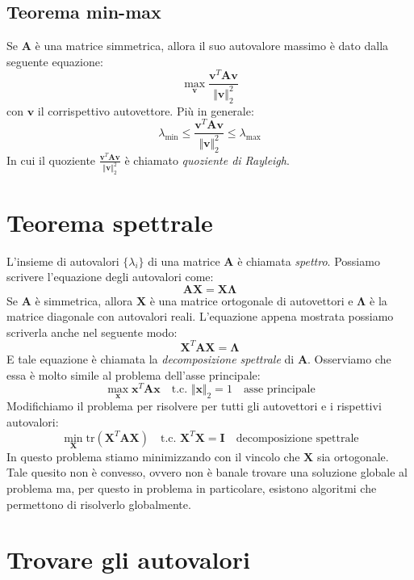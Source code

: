\documentclass{article}
\begin{document}
        \subsection{Teorema min-max}
            Se $\mathbf{A}$ è una matrice simmetrica, allora il suo autovalore massimo è dato dalla seguente equazione:
            \[\max_\mathbf{v} \frac{\mathbf{v}^T\mathbf{Av}}{\Vert \mathbf{v} \Vert_2^2}\]
            con $\mathbf{v}$ il corrispettivo autovettore. Più in generale:
            \[\lambda_{\text{min}} \leq \frac{\mathbf{v}^T\mathbf{Av}}{\Vert \mathbf{v} \Vert_2^2} \leq \lambda_{\text{max}}\]
            In cui il quoziente $\frac{\mathbf{v}^T\mathbf{Av}}{\Vert \mathbf{v} \Vert_2^2}$ è chiamato \emph{quoziente di Rayleigh}.

    \section{Teorema spettrale}
        L'insieme di autovalori $\{\lambda_i\}$ di una matrice $\mathbf{A}$ è chiamata \emph{spettro}. Possiamo scrivere 
        l'equazione degli autovalori come:
        \[\mathbf{AX} = \mathbf{X\Lambda} \]
        Se $\mathbf{A}$ è simmetrica, allora $\mathbf{X}$ è una matrice ortogonale di autovettori e $\mathbf{\Lambda}$ è la matrice
        diagonale con autovalori reali. L'equazione appena mostrata possiamo scriverla anche nel seguente modo:
        \[\mathbf{X}^T \mathbf{AX} = \mathbf{\Lambda} \]
        E tale equazione è chiamata la \emph{decomposizione spettrale} di $\mathbf{A}$. Osserviamo che essa è molto simile al problema 
        dell'asse principale:
        \[\max_{\mathbf{x}} \mathbf{x}^T\mathbf{Ax} \quad \text{t.c. }\Vert\mathbf{x}\Vert_2 = 1 \quad \text{asse principale}\]
        Modifichiamo il problema per risolvere per tutti gli autovettori e i rispettivi autovalori:
        \[\min_{\mathbf{X}} \text{tr}(\mathbf{X}^T\mathbf{AX}) \quad \text{t.c. }\mathbf{X}^T\mathbf{X}=\mathbf{I} \quad \text{decomposizione spettrale}\]
        In questo problema stiamo minimizzando con il vincolo che $\mathbf{X}$ sia ortogonale. Tale quesito non è convesso, 
        ovvero non è banale trovare 
        una soluzione globale al problema ma, per questo in problema in particolare, esistono algoritmi che permettono di risolverlo globalmente. 
\newpage
    \section{Trovare gli autovalori}
\end{document}

